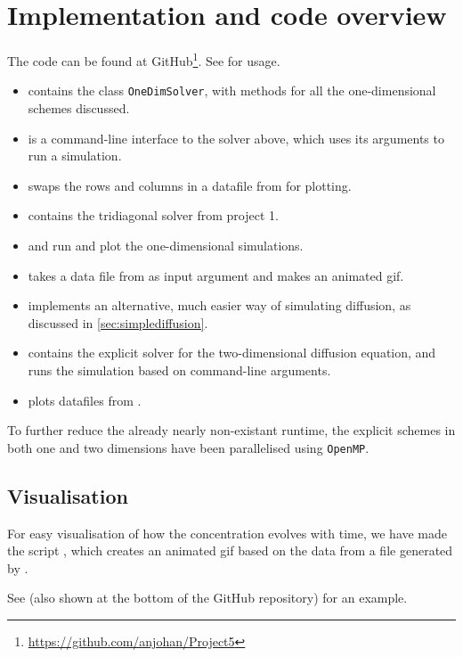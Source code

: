 \section{Implementation and code overview}
The code can be found at GitHub\footnote{\url{https://github.com/anjohan/Project5}}. See  for usage.

\begin{itemize}
\item {} contains the class \texttt{OneDimSolver}, with methods for all the one-dimensional schemes discussed.
\item {} is a command-line interface to the solver above, which uses its arguments to run a simulation.
\item {} swaps the rows and columns in a datafile from  for plotting.
\item {} contains the tridiagonal solver from project 1.
\item {} and  run and plot the one-dimensional simulations.
\item {} takes a data file from  as input argument and makes an animated gif.
\item {} implements an alternative, much easier way of simulating diffusion, as discussed in \ref{sec:simplediffusion}.
\item {} contains the explicit solver for the two-dimensional diffusion equation, and runs the simulation based on command-line arguments.
\item {} plots datafiles from .
\end{itemize}
To further reduce the already nearly non-existant runtime, the explicit schemes in both one and two dimensions have been parallelised using \texttt{OpenMP}.

\subsection{Visualisation}
For easy visualisation of how the concentration evolves with time, we have made the script , which creates an animated gif based on the data from a file generated by .

See  (also shown at the bottom of the GitHub repository) for an example.
